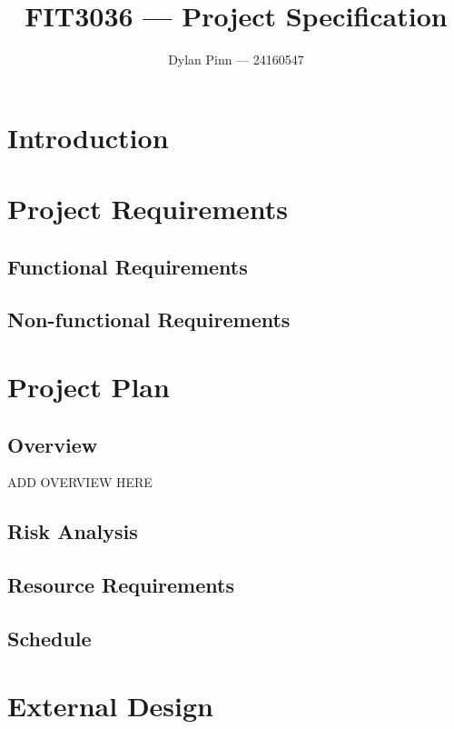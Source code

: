 \documentclass[a4paper,11pt]{article}
\begin{document}
\title{FIT3036 --- Project Specification}
\author{Dylan Pinn --- 24160547}
\maketitle
\pagebreak

\tableofcontents
\pagebreak

\section{Introduction}

\section{Project Requirements}

\subsection{Functional Requirements}

\subsection{Non-functional Requirements}

\section{Project Plan}

\subsection{Overview}

ADD OVERVIEW HERE

\subsection{Risk Analysis}

\subsection{Resource Requirements}

\subsection{Schedule}

\section{External Design}
\end{document}
